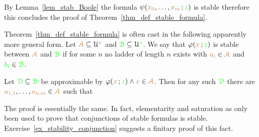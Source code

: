 






By Lemma~\ref{lem_stab_Boole} the formula $\psi({\color{brown} x_0},\dots,{\color{brown} x_m}\,;{\color{green} z})$ is stable therefore this concludes the proof of Theorem~\ref{thm_def_stable_formula}. 

\begin{remark}\label{rem_sability_no_compactness}
  Theorem~\ref{thm_def_stable_formula} is often cast in the following  apparently more general form.
  Let ${\color{brown}\EuScript A}\subseteq\EuScript U^{\color{brown} x}$ and ${\color{green}\EuScript B}\subseteq\EuScript U^{\color{green} z}$.
  We say that $\varphi({\color{brown} x}\,;{\color{green} z})$ is stable between ${\color{brown}\EuScript A}$ and ${\color{green}\EuScript B}$ if for some $n$ no ladder of length $n$ exists with ${\color{brown} a_i}\in{\color{brown}\EuScript A}$ and ${\color{green} b_i}\in{\color{green}\EuScript B}$.

  Let ${\color{green}\EuScript D}\subseteq{\color{green}\EuScript B}$ be approximable by $\varphi({\color{brown} x}\,;{\color{green} z})\wedge {\color{brown}x}\in{\color{brown}\EuScript A}$.
  Then for any such ${\color{green}\EuScript D}$ there are ${\color{brown} a_{1,1}},\dots,{\color{brown} a_{n,m}}\in {\color{brown}\EuScript A}$ such that 
  
  
  The proof is essentially the same. 
  In fact, elementarity and saturation as only been used to prove that conjunctions of stable formulas is stable.
  Exercise~\ref{ex_stability_conjunction} suggests a finitary proof of this fact.
\end{remark} 

